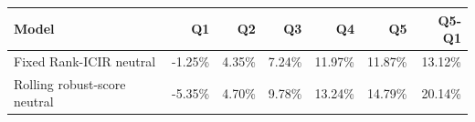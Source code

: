 \begin{tabular}{lrrrrrr}
\toprule
Model & Q1 & Q2 & Q3 & Q4 & Q5 & Q5-Q1 \\
\midrule
Fixed Rank-ICIR neutral & -1.25\% & 4.35\% & 7.24\% & 11.97\% & 11.87\% & 13.12\% \\
Rolling robust-score neutral & -5.35\% & 4.70\% & 9.78\% & 13.24\% & 14.79\% & 20.14\% \\
\bottomrule
\end{tabular}
